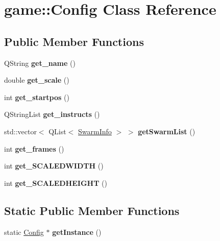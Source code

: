 \hypertarget{classgame_1_1Config}{}\section{game\+:\+:Config Class Reference}
\label{classgame_1_1Config}
\subsection*{Public Member Functions}
\begin{DoxyCompactItemize}
\item 
\mbox{\label{classgame_1_1Config_aaa28fbdf3d41f3f328178c6d5f600dd9}} 
Q\+String {\bfseries get\+\_\+name} ()
\item 
\mbox{\label{classgame_1_1Config_af4786d89e182b04fdc5381d0f026246f}} 
double {\bfseries get\+\_\+scale} ()
\item 
\mbox{\label{classgame_1_1Config_a31429fda8ce34409b92fc05cc418f3d9}} 
int {\bfseries get\+\_\+startpos} ()
\item 
\mbox{\label{classgame_1_1Config_a433e55f6acf9ed182c385be1acf7192a}} 
Q\+String\+List {\bfseries get\+\_\+instructs} ()
\item 
\mbox{\label{classgame_1_1Config_ae0a829cf9b316fa80aa75b4033cbaf9d}} 
std\+::vector$<$ Q\+List$<$ \hyperlink{classgame_1_1SwarmInfo}{Swarm\+Info} $>$ $>$ {\bfseries get\+Swarm\+List} ()
\item 
\mbox{\label{classgame_1_1Config_a800502a13dde9c77704f84edce0bd8cb}} 
int {\bfseries get\+\_\+frames} ()
\item 
\mbox{\label{classgame_1_1Config_a06ecefbce47873f8522064d849746661}} 
int {\bfseries get\+\_\+\+S\+C\+A\+L\+E\+D\+W\+I\+D\+TH} ()
\item 
\mbox{\label{classgame_1_1Config_aecf22ed360bb9410c932baa9534b8450}} 
int {\bfseries get\+\_\+\+S\+C\+A\+L\+E\+D\+H\+E\+I\+G\+HT} ()
\end{DoxyCompactItemize}
\subsection*{Static Public Member Functions}
\begin{DoxyCompactItemize}
\item 
\mbox{\label{classgame_1_1Config_a0920ff53c42bdb9b38499d5f06f77cea}} 
static \hyperlink{classgame_1_1Config}{Config} $\ast$ {\bfseries get\+Instance} ()
\end{DoxyCompactItemize}
